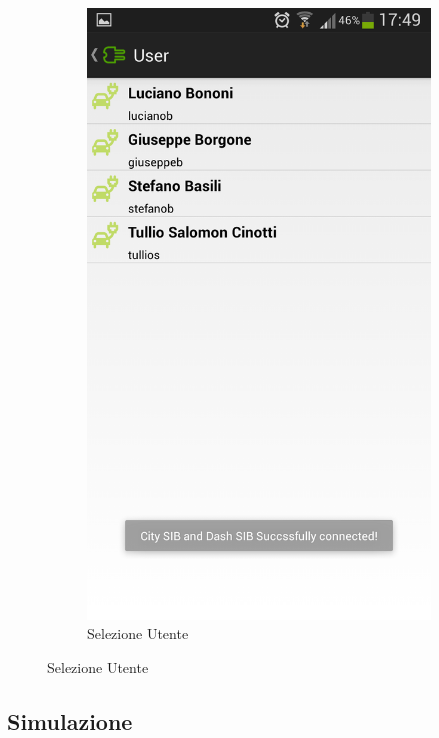 \begin{figure}
\begin{subfigure}{0.49\textwidth}
		\includegraphics[width=\textwidth]{assets/mobile-app-select-user.png}
		\caption{Selezione Utente}
		\label{fig:select-user}
    \end{subfigure}
\end{figure}

\subsection{Simulazione}

